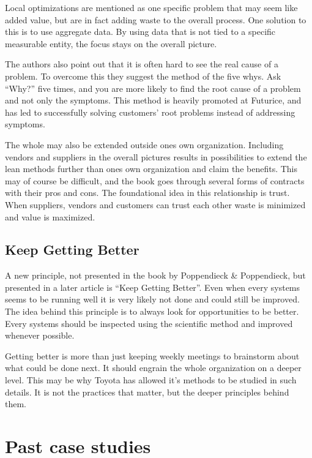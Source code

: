 Local optimizations are mentioned as one specific problem that may seem like added value, but are in fact adding waste to the overall process. One solution to this is to use aggregate data. By using data that is not tied to a specific measurable entity, the focus stays on the overall picture.\cite{poppendieck2003lean}

The authors also point out that it is often hard to see the real cause of a problem. To overcome this they suggest the method of the five whys. Ask ``Why?'' five times, and you are more likely to find the root cause of a problem and not only the symptoms.\cite{poppendieck2003lean} This method is heavily promoted at Futurice, and has led to successfully solving customers' root problems instead of addressing symptoms.

The whole may also be extended outside ones own organization. Including vendors and suppliers in the overall pictures results in possibilities to extend the lean methods further than ones own organization and claim the benefits. This may of course be difficult, and the book goes through several forms of contracts with their pros and cons. The foundational idea in this relationship is trust. When suppliers, vendors and customers can trust each other waste is minimized and value is maximized.\cite{poppendieck2003lean}


\subsection{Keep Getting Better}

A new principle, not presented in the book by Poppendieck \& Poppendieck, but presented in a later article is ``Keep Getting Better''. Even when every systems seems to be running well it is very likely not done and could still be improved. The idea behind this principle is to always look for opportunities to be better. Every systems should be inspected using the scientific method and improved whenever possible.\cite{Poppendieck2012Lean}

Getting better is more than just keeping weekly meetings to brainstorm about what could be done next. It should engrain the whole organization on a deeper level. This may be why Toyota has allowed it's methods to be studied in such details. It is not the practices that matter, but the deeper principles behind them.\cite{rother2009toyota}

\section{Past case studies}
\label{section:casestudies}

